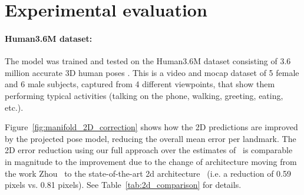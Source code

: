 \documentclass[10pt,twocolumn,letterpaper]{article}
\begin{document}
\section{Experimental evaluation}
\label{sec:exper-eval}
\paragraph{Human3.6M dataset:}
The  model was trained and tested on the Human3.6M dataset consisting
of 3.6 million accurate 3D human poses \cite{ionescu2014human3}. This
is a video and mocap dataset of 5 female and 6 male subjects, captured from 4
different viewpoints, that show them performing typical activities
(talking on the phone, walking, greeting, eating, etc.).


Figure~\ref{fig:manifold_2D_correction} shows how the 2D predictions
are improved by the  projected pose model, reducing the overall mean
error per landmark. The 2D error reduction  using our full approach
over the estimates of~\cite{wei2016convolutional} is comparable in
magnitude to the improvement due to the change of architecture moving
from the work Zhou~\etal\cite{zhou2015sparseness} to the
state-of-the-art 2d architecture~\cite{wei2016convolutional} (i.e. a
reduction of 0.59 pixels vs. 0.81 pixels). See
Table~\ref{tab:2d_comparison} for details.
\end{document}
